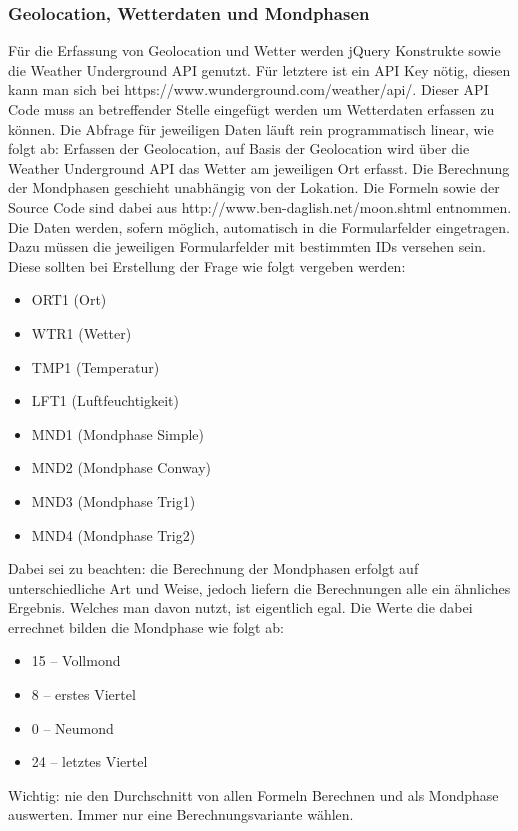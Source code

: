 \subsubsection{Geolocation, Wetterdaten und Mondphasen}
Für die Erfassung von Geolocation und Wetter werden jQuery Konstrukte sowie die Weather Underground API genutzt. Für letztere ist ein API Key nötig, diesen kann man sich bei https://www.wunderground.com/weather/api/. Dieser API Code muss an betreffender Stelle eingefügt werden um Wetterdaten erfassen zu können.
Die Abfrage für jeweiligen Daten läuft rein programmatisch linear, wie folgt ab:
Erfassen der Geolocation, auf Basis der Geolocation wird über die Weather Underground API das Wetter am jeweiligen Ort erfasst. Die Berechnung der Mondphasen geschieht unabhängig von der Lokation. Die Formeln sowie der Source Code sind dabei aus http://www.ben-daglish.net/moon.shtml entnommen.
Die Daten werden, sofern möglich, automatisch in die Formularfelder eingetragen. Dazu müssen die jeweiligen Formularfelder mit bestimmten IDs versehen sein. Diese sollten bei Erstellung der Frage wie folgt vergeben werden:
\begin{itemize}
\item ORT1 (Ort)
\item WTR1 (Wetter)
\item TMP1 (Temperatur)
\item LFT1 (Luftfeuchtigkeit)
\item MND1 (Mondphase Simple)
\item MND2 (Mondphase Conway)
\item MND3 (Mondphase Trig1)
\item MND4 (Mondphase Trig2)
\end{itemize}
Dabei sei zu beachten: die Berechnung der Mondphasen erfolgt auf unterschiedliche Art und Weise, jedoch liefern die Berechnungen alle ein ähnliches Ergebnis. Welches man davon nutzt, ist eigentlich egal. Die Werte die dabei errechnet bilden die Mondphase wie folgt ab:
\begin{itemize}
  \item 15 – Vollmond 
  \item 8 – erstes Viertel 
  \item 0 – Neumond 
  \item 24 – letztes Viertel 
\end{itemize}
Wichtig: nie den Durchschnitt von allen Formeln Berechnen und als Mondphase auswerten. Immer nur eine Berechnungsvariante wählen.
